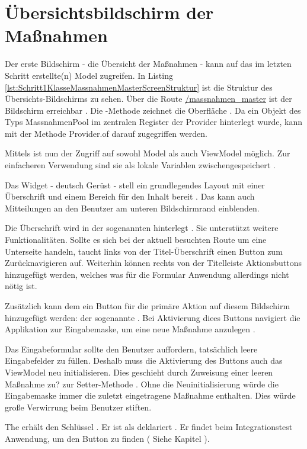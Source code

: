 
\ifIncludeFigures \clearpage \fi
\section{Übersichtsbildschirm der Maßnahmen}

Der erste Bildschirm - die Übersicht der Maßnahmen - kann auf das im letzten Schritt erstellte(n) Model zugreifen.
In Listing \ref{lst:Schritt1KlasseMassnahmenMasterScreenStruktur}  ist die Struktur des Übersichts-Bildschirms zu sehen. Über die Route \url{/massnahmen_master} ist der Bildschirm erreichbar . Die -Methode zeichnet die Oberfläche .  Da ein Objekt des Typs
MassnahmenPool im zentralen  Register der Provider hinterlegt wurde, kann mit der Methode Provider.of darauf zugegriffen werden.

Mittels  ist nun der Zugriff auf sowohl Model als auch ViewModel möglich. Zur einfacheren Verwendung sind sie als lokale Variablen zwischengespeichert .

Das Widget  - deutsch Gerüst -  stell  ein grundlegendes Layout mit einer Überschrift und einem Bereich für den Inhalt bereit .
Das  kann auch Mitteilungen an den Benutzer am unteren Bildschirmrand einblenden.

Die Überschrift wird in der sogenannten  hinterlegt .
Sie unterstützt weitere Funktionalitäten.
Sollte es sich bei der aktuell besuchten Route  um eine Unterseite handeln, taucht links von der Titel-Überschrift einen Button zum Zurücknavigieren auf.
Weiterhin können rechts von der Titelleiste Aktionsbuttons hinzugefügt werden, welches was für die Formular Anwendung allerdings nicht nötig ist.

Zusätzlich kann dem  ein Button für die primäre Aktion auf diesem Bildschirm hinzugefügt werden: der sogenannte  .
Bei Aktivierung diees Buttons navigiert die Applikation zur Eingabemaske, um eine neue Maßnahme anzulegen .

Das Eingabeformular sollte den Benutzer auffordern, tatsächlich leere Eingabefelder zu füllen.
Deshalb muss die Aktivierung des Buttons auch das ViewModel neu initialisieren.
Dies geschieht durch Zuweisung einer leeren Maßnahme zu? zur Setter-Methode  . Ohne die Neuinitialisierung würde die Eingabemaske immer die zuletzt eingetragene Maßnahme enthalten. Dies würde große Verwirrung beim Benutzer stiften.

The  erhält den Schlüssel  .
Er ist als  deklariert .
Er findet beim Integrationstest Anwendung, um den Button zu finden ( Siehe Kapitel ).

